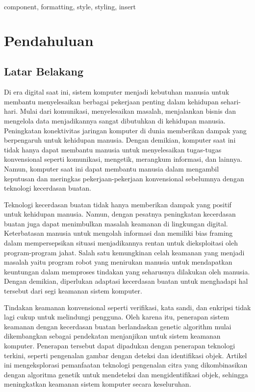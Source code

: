 \documentclass[conference]{IEEEtran}
\begin{document}
\begin{IEEEkeywords}
    component, formatting, style, styling, insert
\end{IEEEkeywords}


\section{Pendahuluan}
\subsection{Latar Belakang}
Di era digital saat ini, sistem komputer menjadi kebutuhan manusia untuk membantu menyelesaikan berbagai pekerjaan penting dalam kehidupan sehari-hari. Mulai dari komunikasi, menyelesaikan masalah, menjalankan bisnis dan mengelola data menjadikannya sangat dibutuhkan di kehidupan manusia. Peningkatan konektivitas jaringan komputer di dunia memberikan dampak yang berpengaruh untuk kehidupan manusia. Dengan demikian, komputer saat ini tidak hanya dapat membantu manusia untuk menyelesaikan tugas-tugas konvensional seperti komunikasi, mengetik, merangkum informasi, dan lainnya. Namun, komputer saat ini dapat membantu manusia dalam mengambil keputusan dan meringkas pekerjaan-pekerjaan konvensional sebelumnya dengan teknologi kecerdasan buatan.

Teknologi kecerdasan buatan tidak hanya memberikan dampak yang positif untuk kehidupan manusia. Namun, dengan pesatnya peningkatan kecerdasan buatan juga dapat menimbulkan masalah keamanan di lingkungan digital. Keterbatasan manusia untuk mengolah informasi dan memiliki bias framing dalam mempersepsikan situasi menjadikannya rentan untuk dieksploitasi oleh program-program jahat. Salah satu kemungkinan celah keamanan yang menjadi masalah yaitu program robot yang menirukan manusia untuk mendapatkan keuntungan dalam memproses tindakan yang seharusnya dilakukan oleh manusia. Dengan demikian, diperlukan adaptasi kecerdasan buatan untuk menghadapi hal tersebut dari segi keamanan sistem komputer.

Tindakan keamanan konvensional seperti verifikasi, kata sandi, dan enkripsi tidak lagi cukup untuk melindungi pengguna. Oleh karena itu, penerapan sistem keamanan dengan kecerdasan buatan berlandaskan genetic algorithm mulai dikembangkan sebagai pendekatan menjanjikan untuk sistem keamanan komputer. Penerapan tersebut dapat dipadukan dengan penerapan teknologi terkini, seperti pengenalan gambar dengan deteksi dan identifikasi objek. Artikel ini mengeksplorasi pemanfaatan teknologi pengenalan citra yang dikombinasikan dengan algoritma genetik untuk mendeteksi dan mengidentifikasi objek, sehingga meningkatkan keamanan sistem komputer secara keseluruhan.
\end{document}
